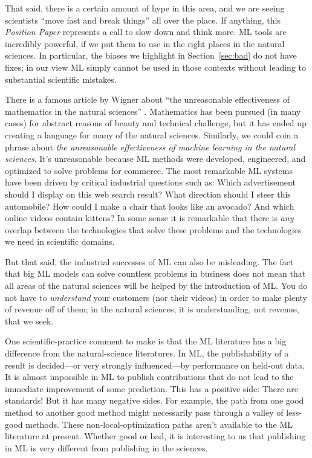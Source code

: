 \documentclass[10pt]{article}
\newcommand{\documentname}{\textsl{Position Paper}}
\newcommand{\sectionname}{Section}
\newcommand{\secref}[1]{\sectionname~\ref{#1}}
\begin{document}
That said, there is a certain amount of hype in this area, and we are seeing scientists ``move fast and break things'' all over the place.
If anything, this \documentname{} represents a call to slow down and think more.
ML tools are incredibly powerful, if we put them to use in the right places in the natural sciences.
In particular, the biases we highlight in \secref{sec:bad} do not have fixes; in our view ML simply cannot be used in those contexts without leading to substantial scientific mistakes.

There is a famous article by Wigner about ``the unreasonable effectiveness of mathematics in the natural sciences'' \cite{wigner}.
Mathematics has been pursued (in many cases) for abstract reasons of beauty and technical challenge, but it has ended up creating a language for many of the natural sciences.
Similarly, we could coin a phrase about \emph{the unreasonable effectiveness of machine learning in the natural sciences}.
It's unreasonable because ML methods were developed, engineered, and optimized to solve problems for commerce.
The most remarkable ML systems have been driven by critical industrial questions such as:
Which advertisement should I display on this web search result?
What direction should I steer this automobile?
How could I make a chair that looks like an avocado?
And which online videos contain kittens?
In some sense it is remarkable that there is \emph{any} overlap between the technologies that solve these problems and the technologies we need in scientific domains.

But that said, the industrial successes of ML can also be misleading.
The fact that big ML models can solve countless problems in business does not mean that all areas of the natural sciences will be helped by the introduction of ML.
You do not have to \emph{understand} your customers (nor their videos) in order to make plenty of revenue off of them; in the natural sciences, it is understanding, not revenue, that we seek.

One scientific-practice comment to make is that the ML literature has a big difference from the natural-science literatures.
In ML, the publishability of a result is decided---or very strongly influenced---by performance on held-out data.
It is almost impossible in ML to publish contributions that do not lead to the immediate improvement of some prediction.
This has a positive side: There are standards!
But it has many negative sides.
For example, the path from one good method to another good method might necessarily pass through a valley of less-good methods.
These non-local-optimization paths aren't available to the ML literature at present.
Whether good or bad, it is interesting to us that publishing in ML is very different from publishing in the sciences.
\end{document}
